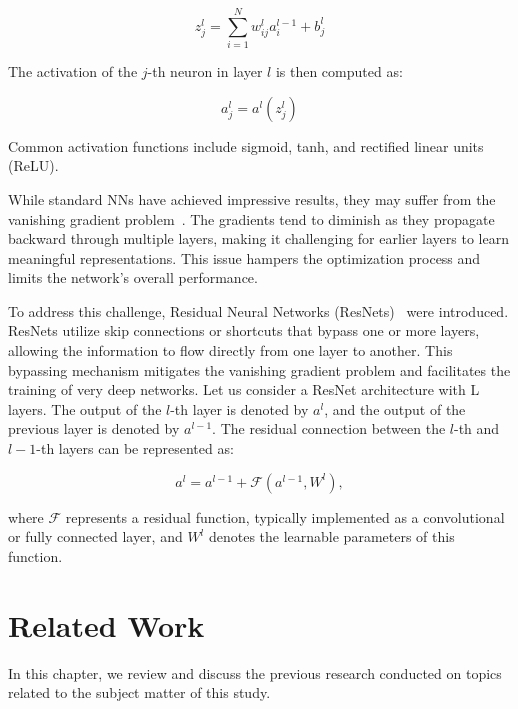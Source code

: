 \documentclass[ppgc,diss,english]{iiufrgs}
\begin{document}
$$z^{l}_{j} = \sum_{i=1}^{N} w^{l}_{ij} a^{l-1}_{i} + b^{l}_{j}$$

The activation of the $j$-th neuron in layer $l$ is then computed as:

$$a^{l}_{j} = a^{l}(z^{l}_{j})$$

Common activation functions include sigmoid, tanh, and rectified linear units (ReLU).

While standard NNs have achieved impressive results, they may suffer from the vanishing gradient problem~\cite{Bengio.etal/1994}. The gradients tend to diminish as they propagate backward through multiple layers, making it challenging for earlier layers to learn meaningful representations. This issue hampers the optimization process and limits the network's overall performance.

To address this challenge, Residual Neural Networks (ResNets)~\cite{He.etal/2016} were introduced. ResNets utilize skip connections or shortcuts that bypass one or more layers, allowing the information to flow directly from one layer to another. This bypassing mechanism mitigates the vanishing gradient problem and facilitates the training of very deep networks. Let us consider a ResNet architecture with L layers. The output of the $l$-th layer is denoted by $a^{l}$, and the output of the previous layer is denoted by $a^{l-1}$. The residual connection between the $l$-th and $l-1$-th layers can be represented as:

$$a^{l} = a^{l-1} + \mathcal{F}(a^{l-1}, W^{l}),$$

where $\mathcal{F}$ represents a residual function, typically implemented as a convolutional or fully connected layer, and $W^{l}$ denotes the learnable parameters of this function.


\chapter{Related Work}
In this chapter, we review and discuss the previous research conducted on topics related to the subject matter of this study.
\end{document}
